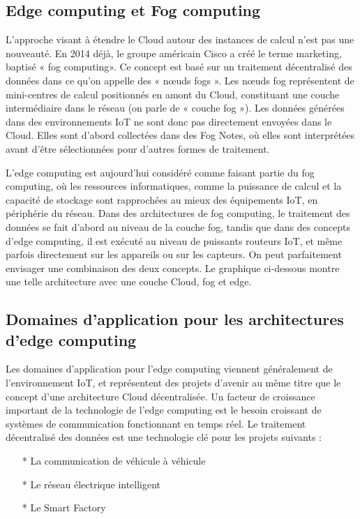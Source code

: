 \subsection{Edge computing et Fog computing}
L’approche visant à étendre le Cloud autour des instances de calcul n’est pas une nouveauté. En 2014 déjà, le groupe américain Cisco a créé le terme marketing, baptisé « fog computing». Ce concept est basé sur un traitement décentralisé des données dans ce qu’on appelle des « nœuds fogs ». Les nœuds fog représentent de mini-centres de calcul positionnés en amont du Cloud, constituant une couche intermédiaire dans le réseau (on parle de « couche fog »). Les données générées dans des environnements IoT ne sont donc pas directement envoyées dans le Cloud. Elles sont d’abord collectées dans des Fog Notes, où elles sont interprétées avant d’être sélectionnées pour d’autres formes de traitement.

L’edge computing est aujourd’hui considéré comme faisant partie du fog computing, où les ressources informatiques, comme la puissance de calcul et la capacité de stockage sont rapprochées au mieux des équipements IoT, en périphérie du réseau. Dans des architectures de fog computing, le traitement des données se fait d’abord au niveau de la couche fog, tandis que dans des concepts d’edge computing, il est exécuté au niveau de puissants routeurs IoT, et même parfois directement sur les appareils ou sur les capteurs. On peut parfaitement envisager une combinaison des deux concepts. Le graphique ci-dessous montre une telle architecture avec une couche Cloud, fog et edge.
\subsection{Domaines d’application pour les architectures d’edge computing}
Les domaines d’application pour l’edge computing viennent généralement de l’environnement IoT, et représentent des projets d’avenir au même titre que le concept d’une architecture Cloud décentralisée. Un facteur de croissance important de la technologie de l’edge computing est le besoin croissant de systèmes de communication fonctionnant en temps réel. Le traitement décentralisé des données est une technologie clé pour les projets suivants :

\begin{itemize}
    \item[*] La communication de véhicule à véhicule
     \item[*]Le réseau électrique intelligent
      \item[*]Le Smart Factory
\end{itemize}


